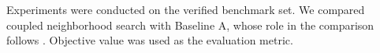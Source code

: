 Experiments were conducted on the verified benchmark set. We compared coupled neighborhood search with Baseline A, whose role in the comparison follows \cite{baseline2026}. Objective value was used as the evaluation metric.
